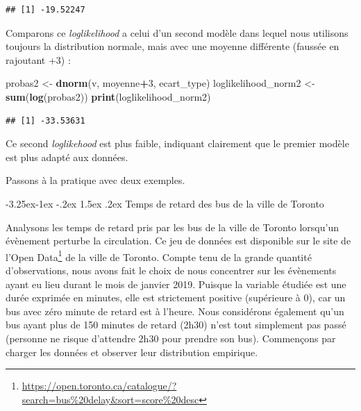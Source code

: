 \documentclass[
  11pt,
  french,
]{book}
\makeatletter
\newenvironment{Shaded}{\begin{snugshade}}{\end{snugshade}}
\newcommand{\DecValTok}[1]{\textcolor[rgb]{0.00,0.00,0.81}{#1}}
\newcommand{\KeywordTok}[1]{\textcolor[rgb]{0.13,0.29,0.53}{\textbf{#1}}}
\newcommand{\NormalTok}[1]{#1}
\newcommand{\OperatorTok}[1]{\textcolor[rgb]{0.81,0.36,0.00}{\textbf{#1}}}
\newcommand{\StringTok}[1]{\textcolor[rgb]{0.31,0.60,0.02}{#1}}
\renewcommand{\href}[2]{#2\footnote{\url{#1}}}
\newenvironment{kframe}{%
\medskip{}
\setlength{\fboxsep}{.8em}
 \def\at@end@of@kframe{}%
 \ifinner\ifhmode%
  \def\at@end@of@kframe{\end{minipage}}%
  \begin{minipage}{\columnwidth}%
 \fi\fi%
 \def\FrameCommand##1{\hskip\@totalleftmargin \hskip-\fboxsep
 \colorbox{shadecolor}{##1}\hskip-\fboxsep
     \hskip-\linewidth \hskip-\@totalleftmargin \hskip\columnwidth}%
 \MakeFramed {\advance\hsize-\width
   \@totalleftmargin\z@ \linewidth\hsize
   \@setminipage}}%
 {\par\unskip\endMakeFramed%
 \at@end@of@kframe}
\newenvironment{kframev}{%
\medskip{}
\setlength{\fboxsep}{.8em}
 \def\at@end@of@kframev{}%
 \ifinner\ifhmode%
  \def\at@end@of@kframev{\end{minipage}}%
  \begin{minipage}{\columnwidth}%
 \fi\fi%
 \def\FrameCommand##1{\hskip\@totalleftmargin \hskip-\fboxsep
 \colorbox{shadebluecolor}{##1}\hskip-\fboxsep
     \hskip-\linewidth \hskip-\@totalleftmargin \hskip\columnwidth}%
 \MakeFramed {\advance\hsize-\width
   \@totalleftmargin\z@ \linewidth\hsize
   \@setminipage}}%
 {\par\unskip\endMakeFramed%
 \at@end@of@kframev}
\renewenvironment{Shaded}{\begin{kframe}}{\end{kframe}}
\newenvironment{rmdblock}[1]
  {
  \begin{itemize}
  \renewcommand{\labelitemi}{
    \raisebox{-.7\height}[0pt][0pt]{
      {\setkeys{Gin}{width=3em,keepaspectratio}\texttt{[image: images/\#1]}}
    }
  }
  \setlength{\fboxsep}{1em}
  \begin{kframev}
  \small
  \item
  }
  {
  \end{kframev}
  \end{itemize}
  }
\newenvironment{bloc_aller_loin}
  {\begin{rmdblock}{aller_loin}}
  {\end{rmdblock}}
\renewcommand\paragraph{\@startsection{paragraph}{4}{\z@}%
   {-3.25ex\@plus -1ex \@minus -.2ex}%
   {1.5ex \@plus .2ex}%
   {\normalfont\normalsize\bfseries}}
\makeatother
\begin{document}
\begin{bloc_aller_loin}
\begin{verbatim}
## [1] -19.52247
\end{verbatim}

Comparons ce \emph{loglikelihood} a celui d'un second modèle dans lequel nous utilisons toujours la distribution normale, mais avec une moyenne différente (faussée en rajoutant +3) :

\begin{Shaded}
\begin{Highlighting}[]
\NormalTok{probas2 <-}\StringTok{ }\KeywordTok{dnorm}\NormalTok{(v, moyenne}\OperatorTok{+}\DecValTok{3}\NormalTok{, ecart_type)}
\NormalTok{loglikelihood_norm2 <-}\StringTok{ }\KeywordTok{sum}\NormalTok{(}\KeywordTok{log}\NormalTok{(probas2))}
\KeywordTok{print}\NormalTok{(loglikelihood_norm2)}
\end{Highlighting}
\end{Shaded}

\begin{verbatim}
## [1] -33.53631
\end{verbatim}

Ce second \emph{loglikehood} est plus faible, indiquant clairement que le premier modèle est plus adapté aux données.

\end{bloc_aller_loin}

Passons à la pratique avec deux exemples.

\hypertarget{temps-de-retard-des-bus-de-la-ville-de-toronto}{%
\paragraph{Temps de retard des bus de la ville de Toronto}\label{temps-de-retard-des-bus-de-la-ville-de-toronto}}

Analysons les temps de retard pris par les bus de la ville de Toronto lorsqu'un évènement perturbe la circulation. Ce jeu de données est disponible sur le site de l'\href{https://open.toronto.ca/catalogue/?search=bus\%20delay\&sort=score\%20desc}{Open Data} de la ville de Toronto. Compte tenu de la grande quantité d'observations, nous avons fait le choix de nous concentrer sur les évènements ayant eu lieu durant le mois de janvier 2019. Puisque la variable étudiée est une durée exprimée en minutes, elle est strictement positive (supérieure à 0), car un bus avec zéro minute de retard est à l'heure. Nous considérons également qu'un bus ayant plus de 150 minutes de retard (2h30) n'est tout simplement pas passé (personne ne risque d'attendre 2h30 pour prendre son bus). Commençons par charger les données et observer leur distribution empirique.
\end{document}
